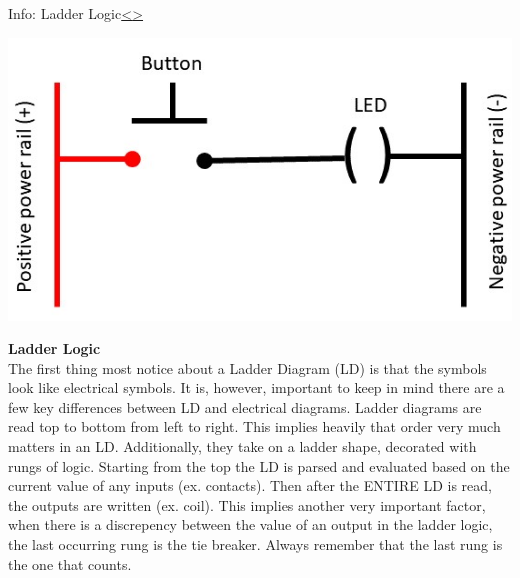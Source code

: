 \documentclass[12pt]{extarticle}
\newenvironment{instructionblock}{\Large\bgroup}{\egroup}
\newcounter{next}
\newcounter{prev}
\begin{document}
\pagebreak
{}
\begin{slide}{Info: Ladder Logic}{\hyperref[slide \theprev]{\textless}\hyperref[slide \thenext]{\textgreater}}
\begin{instructionblock}
\begin{center}
	\includegraphics[scale=1]{figures/LadderDiagram01.JPG}
\end{center}
\end{instructionblock}
\end{slide} 
\vfill
\noindent
\textbf{Ladder Logic}\\
The first thing most notice about a Ladder Diagram (LD) is that the symbols look like electrical symbols. It is, however, important to keep in mind there are a few key differences between LD and electrical diagrams. Ladder diagrams are read top to bottom from left to right. This implies heavily that order very much matters in an LD. Additionally, they take on a ladder shape, decorated with rungs of logic. Starting from the top the LD is parsed and evaluated based on the current value of any inputs (ex. contacts). Then after the ENTIRE LD is read, the outputs are written (ex. coil). This implies another very important factor, when there is a discrepency between the value of an output in the ladder logic, the last occurring rung is the tie breaker. Always remember that the last rung is the one that counts. \cite{PLC_acad}

\end{document}
